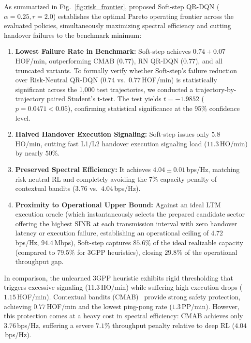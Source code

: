 \documentclass{ieeetmlcn}
\begin{document}
As summarized in Fig.~\ref{fig:risk_frontier}, proposed Soft-step QR-DQN ($\alpha=0.25, r=2.0$) establishes the optimal Pareto operating frontier across the evaluated policies, simultaneously maximizing spectral efficiency and cutting handover failures to the benchmark minimum:
\begin{enumerate}\setlength\itemsep{0.5pt}\setlength\parskip{0pt}
    \item \textbf{Lowest Failure Rate in Benchmark:} Soft-step achieves $\mathbf{0.74 \pm 0.07}$\,HOF/min, outperforming CMAB ($0.77$), RN QR-DQN ($0.77$), and all truncated variants. To formally verify whether Soft-step's failure reduction over Risk-Neutral QR-DQN ($0.74$ vs.\ $0.77$\,HOF/min) is statistically significant across the 1,000 test trajectories, we conducted a trajectory-by-trajectory paired Student's t-test. The test yields $t = -1.9852$ ($p = 0.0471 < 0.05$), confirming statistical significance at the 95\% confidence level.
    \item \textbf{Halved Handover Execution Signaling:} Soft-step issues only $5.8$\,HO/min, cutting fast L1/L2 handover execution signaling load ($11.3$\,HO/min) by nearly $50\%$.
    \item \textbf{Preserved Spectral Efficiency:} It achieves $\mathbf{4.04 \pm 0.01}$\,bps/Hz, matching risk-neutral RL and completely avoiding the 7\% capacity penalty of contextual bandits ($3.76$ vs.\ $4.04$\,bps/Hz).
    \item \textbf{Proximity to Operational Upper Bound:} Against an ideal LTM execution oracle (which instantaneously selects the prepared candidate sector offering the highest SINR at each transmission interval with zero handover latency or execution failure, establishing an operational ceiling of $4.72$\,bps/Hz, $94.4$\,Mbps), Soft-step captures $85.6\%$ of the ideal realizable capacity (compared to  $79.5\%$ for 3GPP heuristics), closing $29.8\%$ of the operational throughput gap.
\end{enumerate}

In comparison, the unlearned 3GPP heuristic exhibits rigid thresholding that triggers excessive signaling ($11.3$\,HO/min) while suffering high execution drops ($1.15$\,HOF/min). Contextual bandits (CMAB)~\cite{cmab_ho} provide strong safety protection, achieving $0.77$\,HOF/min and the lowest ping-pong rate ($1.3$\,PP/min). However, this protection comes at a heavy cost in spectral efficiency: CMAB achieves only $3.76$\,bps/Hz, suffering a severe $7.1\%$ throughput penalty relative to deep RL ($4.04$\,bps/Hz).
\end{document}
